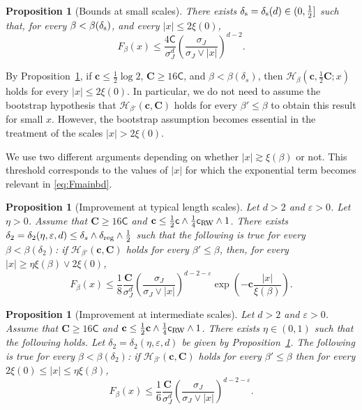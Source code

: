 \documentclass[11pt,a4paper]{article}
\numberwithin{equation}{section}
\theoremstyle{plain}
\newtheorem{Prop}[Thm]{Proposition}
\theoremstyle{definition}
\newcommand\1{\mathds{1}}
\newcommand\bfc{\mathbf{c}}
\newcommand\bfC{\mathbf{C}}
\newcommand\crw{\mathsf{c}_{\textup{RW}}}
\newcommand\CGreen{\mathsf{C}}
\newcommand\cGreen{\mathsf{c}}
\begin{document}
\begin{Prop}[Bounds at small scales]
\label{Prop:smallx} There exists $\delta_{\textup{s}} = \delta_{\textup{s}}(d)\in (0,\tfrac12]$ such that, for every $\beta < \beta(\delta_{\textup{s}})$, and every $|x|\le 2 \xi(0)$,
    \begin{equation}
        F_{\beta}(x)
        \leq
        \frac{ 4 \CGreen}{\sigma_J^d}  \left(\frac{\sigma_J}{\sigma_J \vee |x|}\right)^{d-2}
        .
    \label{eq:smallscalesbound}
    \end{equation}
\end{Prop}

By Proposition~\ref{Prop:smallx}, if $\bfc\leq\tfrac{1}{2}\log 2$, $\bfC\geq 16\mathsf{C}$, and $\beta<\beta(\delta_s)$, then $\mathcal H_{\beta}(\bfc,\tfrac{1}{2}\bfC;x)$ holds for every $|x|\leq 2\xi(0)$. In particular, we do not need to assume the bootstrap hypothesis
that $\mathcal H_{\beta'}(\bfc,\bfC)$ holds for every $\beta'\leq \beta$ to obtain this result for small $x$. However, the bootstrap assumption becomes essential in the treatment of the scales $|x|>2\xi(0)$.


We use two different arguments depending on whether $|x|\gtrsim \xi(\beta)$ or not. This threshold corresponds to the values of $|x|$ for which the exponential term becomes relevant in \eqref{eq:Fmainbd}.

\begin{Prop}[Improvement at typical length scales]
\label{prop: typical scales} Let $d>2$ and $\varepsilon>0$.
Let $\eta >0$.
Assume that $\bfC\ge 16\CGreen$ and
$\bfc \le \frac 12 \cGreen \wedge \frac{1}{4}\crw \wedge 1$.
There exists $\delta_2=\delta_2(\eta,\varepsilon,d)\leq \delta_s\wedge \delta_{\textup{reg}}\wedge \tfrac{1}{2}$ such that the following
is true for every $\beta<\beta(\delta_2)$:
if $\mathcal H_{\beta'}(\bfc,\bfC)$ holds for every $\beta' \le \beta$,
then, for every $|x|\geq \eta \xi(\beta)\vee 2\xi(0)$,
\begin{equation}
	F_\beta(x)
    \leq
    \frac{1}{8} \frac{\bfC}{\sigma^d_J}
    \left(\frac{\sigma_J}{\sigma_J\vee |x|}\right)^{d-2-\varepsilon}
    \exp\left(-\bfc \frac{|x|}{\xi(\beta)}\right).
\end{equation}
\end{Prop}



\begin{Prop}[Improvement at intermediate scales]
\label{prop:intermscales} Let $d>2$ and $\varepsilon>0$. Assume that $\bfC\geq 16\CGreen$ and $\bfc\leq \tfrac{1}{2}\bfc\wedge \tfrac{1}{4}\crw\wedge 1$.
There exists $\eta\in (0,1)$
such that the following holds.
Let $\delta_2=\delta_2(\eta,\varepsilon,d)$ be given by
Proposition~\textup{\ref{prop: typical scales}}. The following is true for every $\beta<\beta(\delta_2)$: if $\mathcal H_{\beta'}(\bfc,\bfC)$ holds for every $\beta' \le \beta$
then for every $2\xi(0)\leq |x|\leq \eta \xi(\beta)$,
\begin{equation}
	F_\beta(x)
    \leq
    \frac{1}{6} \frac{\bfC}{\sigma_J^d}
    \left(\frac{\sigma_J}{\sigma_J\vee |x|}\right)^{d-2-\varepsilon}
    .
\end{equation}
\end{Prop}
\end{document}
